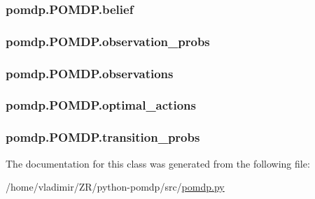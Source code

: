 \subsubsection[{\texorpdfstring{belief}{belief}}]{\setlength{\rightskip}{0pt plus 5cm}pomdp.\+P\+O\+M\+D\+P.\+belief}\hypertarget{classpomdp_1_1POMDP_a46a42a6a078ee5c116004a48bd36293b}{}\label{classpomdp_1_1POMDP_a46a42a6a078ee5c116004a48bd36293b}
\subsubsection[{\texorpdfstring{observation\+\_\+probs}{observation_probs}}]{\setlength{\rightskip}{0pt plus 5cm}pomdp.\+P\+O\+M\+D\+P.\+observation\+\_\+probs}\hypertarget{classpomdp_1_1POMDP_a768131a4afac0d4d24404d12fa5f62fe}{}\label{classpomdp_1_1POMDP_a768131a4afac0d4d24404d12fa5f62fe}
\subsubsection[{\texorpdfstring{observations}{observations}}]{\setlength{\rightskip}{0pt plus 5cm}pomdp.\+P\+O\+M\+D\+P.\+observations}\hypertarget{classpomdp_1_1POMDP_ab936d6506f8610ccb8be4b58de8ec0e5}{}\label{classpomdp_1_1POMDP_ab936d6506f8610ccb8be4b58de8ec0e5}
\subsubsection[{\texorpdfstring{optimal\+\_\+actions}{optimal_actions}}]{\setlength{\rightskip}{0pt plus 5cm}pomdp.\+P\+O\+M\+D\+P.\+optimal\+\_\+actions}\hypertarget{classpomdp_1_1POMDP_a4ddaceb23f7c3e37afc0da249475117d}{}\label{classpomdp_1_1POMDP_a4ddaceb23f7c3e37afc0da249475117d}
\subsubsection[{\texorpdfstring{transition\+\_\+probs}{transition_probs}}]{\setlength{\rightskip}{0pt plus 5cm}pomdp.\+P\+O\+M\+D\+P.\+transition\+\_\+probs}\hypertarget{classpomdp_1_1POMDP_a3561b1af2cc307f204a67b99580faff7}{}\label{classpomdp_1_1POMDP_a3561b1af2cc307f204a67b99580faff7}


The documentation for this class was generated from the following file\+:\begin{DoxyCompactItemize}
\item 
/home/vladimir/\+Z\+R/python-\/pomdp/src/\hyperlink{pomdp_8py}{pomdp.\+py}\end{DoxyCompactItemize}

